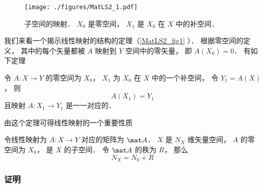 

\begin{figure}[ht]
\centering
\texttt{[image: ./figures/MatLS2\_1.pdf]}
\caption{子空间的映射． $X_0$ 是零空间， $X_1$ 是 $X_0$ 在 $X$ 中的补空间．} \label{MatLS2_fig1}
\end{figure}
我们来看一个揭示线性映射的结构的定理（\autoref{MatLS2_fig1} ）． 根据零空间的定义， 其中的每个矢量都被 $A$ 映射到 $Y$ 空间中的零矢量， 即 $A(X_0) = 0$．   有如下定理

\begin{theorem}{}
令 $A:X \to Y$ 的零空间为 $X_0$， $X_1$ 为 $X_0$ 在 $X$ 中的一个补空间， 令 $Y_1 = A(X)$， 则
\begin{equation}
A(X_1) = Y_1
\end{equation}
且映射 $A:X_1\to Y_1$ 是一一对应的．
\end{theorem}
由这个定理可得线性映射的一个重要性质
\begin{corollary}{}
令线性映射为 $A:X\to Y$ 对应的矩阵为 $\mat A$． $X$ 是 $N_X$ 维矢量空间， $A$ 的零空间为 $X_0$， 是 $X$ 的子空间． 令 $\mat A$ 的秩为 $R$， 那么
\begin{equation}
N_X = N_0 + R
\end{equation}
\end{corollary}


\subsubsection{证明}

